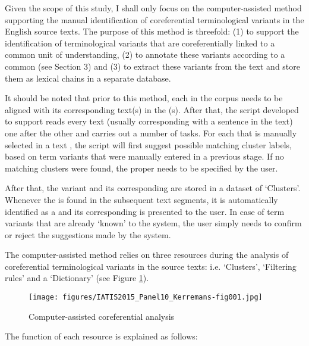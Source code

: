 \documentclass[output=paper]{langsci/langscibook.cls}
\begin{document}
Given the scope of this study, I shall only focus on the computer-assisted method 
supporting the manual identification of coreferential terminological variants in 
the English source texts. The purpose of this method is threefold: (1) to support the identification 
of terminological variants that are coreferentially linked to a common unit of 
understanding, (2) to annotate these variants according to a common  (see 
Section 3) and (3) to extract these variants from the text and store them as lexical chains 
in a separate database.

It should be noted that prior to this method, each  in the corpus needs 
to be aligned with its corresponding text(s) in the (s). After that, 
the script developed to support  reads every text  
(usually corresponding with a sentence in the text) one after the other and carries 
out a number of tasks. For each  that is manually selected 
in a text , the script will first suggest possible matching cluster labels, 
based on term variants that were manually entered in a previous stage. 
If no matching clusters were found, the proper  needs to be specified 
by the user. 

After that, the  variant and its corresponding  are stored 
in a dataset of `Clusters'. Whenever the  is found in 
the subsequent text segments, it is automatically identified as a  
and its corresponding  is presented to the user. In case of term variants 
that are already `known' to the system, the user simply needs to confirm or reject 
the suggestions made by the system.

The computer-assisted method relies on three resources during the analysis of coreferential 
terminological variants in the source texts: i.e. `Clusters', `Filtering rules' 
and a `Dictionary' (see Figure \ref{fig:1}).

\begin{figure}
\texttt{[image: figures/IATIS2015\_Panel10\_Kerremans-fig001.jpg]}
\caption{Computer-assisted coreferential analysis}
\label{fig:1}
\end{figure}

The function of each resource is explained as follows:
\end{document}
